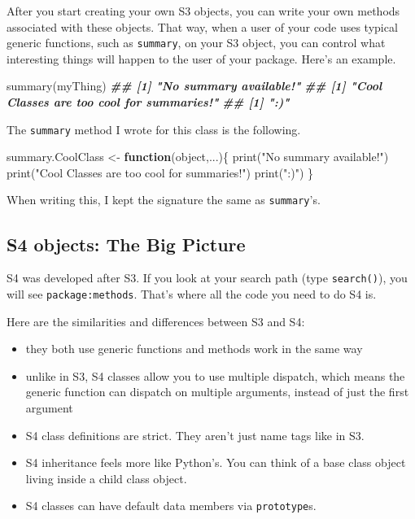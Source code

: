 \documentclass[
  12pt,
  krantz2]{krantz}
\makeatletter
\newenvironment{Shaded}{\begin{snugshade}}{\end{snugshade}}
\newcommand{\ControlFlowTok}[1]{\textcolor[rgb]{0.27,0.27,0.27}{\textbf{#1}}}
\newcommand{\DocumentationTok}[1]{\textcolor[rgb]{0.37,0.37,0.37}{\textbf{\textit{#1}}}}
\newcommand{\FunctionTok}[1]{\textcolor[rgb]{0,0,0}{#1}}
\newcommand{\NormalTok}[1]{#1}
\newcommand{\OtherTok}[1]{\textcolor[rgb]{0.37,0.37,0.37}{#1}}
\newcommand{\StringTok}[1]{\textcolor[rgb]{0.5,0.5,0.5}{#1}}
\providecommand{\tightlist}{%
  \setlength{\itemsep}{0pt}\setlength{\parskip}{0pt}}
\newenvironment{kframe}{%
\medskip{}
\setlength{\fboxsep}{.8em}
 \def\at@end@of@kframe{}%
 \ifinner\ifhmode%
  \def\at@end@of@kframe{\end{minipage}}%
  \begin{minipage}{\columnwidth}%
 \fi\fi%
 \def\FrameCommand##1{\hskip\@totalleftmargin \hskip-\fboxsep
 \colorbox{shadecolor}{##1}\hskip-\fboxsep
     \hskip-\linewidth \hskip-\@totalleftmargin \hskip\columnwidth}%
 \MakeFramed {\advance\hsize-\width
   \@totalleftmargin\z@ \linewidth\hsize
   \@setminipage}}%
 {\par\unskip\endMakeFramed%
 \at@end@of@kframe}
\renewenvironment{Shaded}{\begin{kframe}}{\end{kframe}}
\makeatother
\begin{document}
After you start creating your own S3 objects, you can write your own methods associated with these objects. That way, when a user of your code uses typical generic functions, such as \texttt{summary}, on your S3 object, you can control what interesting things will happen to the user of your package. Here's an example.

\begin{Shaded}
\begin{Highlighting}[]
\FunctionTok{summary}\NormalTok{(myThing)}
\DocumentationTok{\#\# [1] "No summary available!"}
\DocumentationTok{\#\# [1] "Cool Classes are too cool for summaries!"}
\DocumentationTok{\#\# [1] ":)"}
\end{Highlighting}
\end{Shaded}

The \texttt{summary} method I wrote for this class is the following.

\begin{Shaded}
\begin{Highlighting}[]
\NormalTok{summary.CoolClass }\OtherTok{\textless{}{-}} \ControlFlowTok{function}\NormalTok{(object,...)\{}
  \FunctionTok{print}\NormalTok{(}\StringTok{"No summary available!"}\NormalTok{)}
  \FunctionTok{print}\NormalTok{(}\StringTok{"Cool Classes are too cool for summaries!"}\NormalTok{)}
  \FunctionTok{print}\NormalTok{(}\StringTok{":)"}\NormalTok{)}
\NormalTok{\}}
\end{Highlighting}
\end{Shaded}

When writing this, I kept the signature the same as \texttt{summary}'s.

\hypertarget{s4-objects-the-big-picture}{%
\subsection{S4 objects: The Big Picture}\label{s4-objects-the-big-picture}}

S4 was developed after S3. If you look at your search path (type \texttt{search()}), you will see \texttt{package:methods}. That's where all the code you need to do S4 is.

Here are the similarities and differences between S3 and S4:

\begin{itemize}
\tightlist
\item
  they both use generic functions and methods work in the same way
\item
  unlike in S3, S4 classes allow you to use multiple dispatch, which means the generic function can dispatch on multiple arguments, instead of just the first argument
\item
  S4 class definitions are strict. They aren't just name tags like in S3.
\item
  S4 inheritance feels more like Python's. You can think of a base class object living inside a child class object.
\item
  S4 classes can have default data members via \texttt{prototype}s.
\end{itemize}
\end{document}
